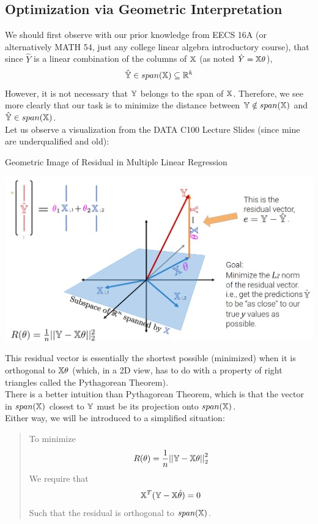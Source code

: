 \subsection{Optimization via Geometric Interpretation}
We should first observe with our prior knowledge from EECS 16A (or alternatively MATH 54, just any college linear algebra introductory course), that since $\hat{Y}$ is a linear combination of the columns of $\mathbb{X}$ (as noted $\hat{Y} = \mathbb{X} \theta$),
\[\hat{\mathbb{Y}} \in span(\mathbb{X}) \subseteq \mathbb{R}^k\]
However, it is not necessary that $\mathbb{Y}$ belongs to the span of $\mathbb{X}$. Therefore, we see more clearly that our task is to minimize the distance between $\mathbb{Y} \notin span(\mathbb{X})$ and $\hat{\mathbb{Y}} \in span(\mathbb{X})$. \\
Let us observe a visualization from the DATA C100 Lecture Slides (since mine are underqualified and old):
\begin{ln-fig}{Geometric Image of Residual in Multiple Linear Regression}{}
    \begin{center}
        \includegraphics[scale=0.3]{figs/ln03/least-square-geometry.png}
    \end{center}
\end{ln-fig}
This residual vector is essentially the shortest possible (minimized) when it is orthogonal to $\mathbb{X} \theta$ (which, in a 2D view, has to do with a property of right triangles called the Pythagorean Theorem). \\
There is a better intuition than Pythagorean Theorem, which is that the vector in $span(\mathbb{X})$ closest to $\mathbb{Y}$ must be its projection onto $span(\mathbb{X})$. \\
Either way, we will be introduced to a simplified situation:
\begin{quote}
    To minimize 
    \[R(\theta) = \frac{1}{n} {||\mathbb{Y} - \mathbb{X} \theta||}_2^2\]
    We require that
    \[\mathbb{X}^T (\mathbb{Y} - \mathbb{X} \hat{\theta}) = 0\]
    Such that the residual is orthogonal to $span(\mathbb{X})$.
\end{quote}
